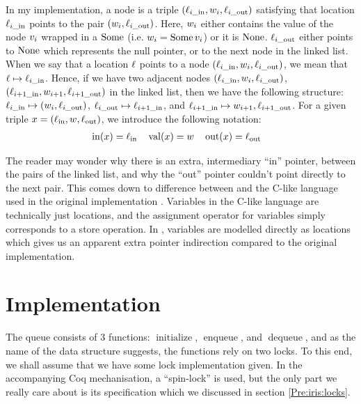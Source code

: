\documentclass[a4paper, 10pt]{report}
\theoremstyle{definition}
\newcommand{\initialise}{\operatorname{initialize}}
\newcommand{\enqueue}{\operatorname{enqueue}}
\newcommand{\dequeue}{\operatorname{dequeue}}
\newcommand{\locin}{\loc_{\mathrm{in}}}
\newcommand{\locinM}[1]{\loc_{#1\_\mathrm{in}}}
\newcommand{\locout}{\loc_{\mathrm{out}}}
\newcommand{\locoutM}[1]{\loc_{#1\_\mathrm{out}}}
\newcommand{\nodeval}{\valB}
\newcommand{\nodevalM}[1]{\nodeval_{#1}}
\newcommand{\nIn}[1]{\operatorname{in}(#1)}
\newcommand{\nVal}[1]{\operatorname{val}(#1)}
\newcommand{\nOut}[1]{\operatorname{out}(#1)}
\newcommand{\node}{x}
\newcommand{\absvalue}{\val}
\begin{document}
In my implementation, a node is a triple $(\locinM{i}, \nodevalM{i}, \locoutM{i})$ satisfying that location $\locinM{i}$ points to the pair $(\nodevalM{i}, \locoutM{i})$. Here, $\nodevalM{i}$ either contains the value of the node $\absvalue_i$ wrapped in a $\operatorname{Some}$ (i.e. $\nodevalM{i} = \Some \absvalue_i$) or it is $\operatorname{None}$. $\locoutM{i}$ either points to $\operatorname{None}$ which represents the null pointer, or to the next node in the linked list. When we say that a location $\ell$ points to a node $(\locinM{i}, \nodevalM{i}, \locoutM{i})$, we mean that $\loc \mapsto \locinM{i}$. Hence, if we have two adjacent nodes $(\locinM{i}, \nodevalM{i}, \locoutM{i})$, $(\locinM{i+1}, \nodevalM{i+1}, \locoutM{i+1})$ in the linked list, then we have the following structure: $\locinM{i} \mapsto (\nodevalM{i}, \locoutM{i})$, $\locoutM{i} \mapsto \locinM{i+1}$, and $\locinM{i+1} \mapsto \nodevalM{i+1}, \locoutM{i+1}$.
For a given triple $\node = (\locin, \nodeval, \locout)$, we introduce the following notation:
\begin{align*}
  &\nIn{\node} = \locin& &\nVal{\node} = \nodeval& &\nOut{\node} = \locout
\end{align*}

The reader may wonder why there is an extra, intermediary ``in'' pointer, between the pairs of the linked list, and why the ``out'' pointer couldn't point directly to the next pair. This comes down to difference between \heaplang and the C-like language used in the original implementation \citep{DBLP:conf/podc/MichaelS96}. Variables in the C-like language are technically just locations, and the assignment operator for variables simply corresponds to a store operation. In \heaplang, variables are modelled directly as locations which gives us an apparent extra pointer indirection compared to the original implementation.


\section{Implementation}
\label{TLMSQ:section:implementation}

The queue consists of 3 functions: $\initialise$, $\enqueue$, and $\dequeue$, and as the name of the data structure suggests, the functions rely on two locks. To this end, we shall assume that we have some lock implementation given. In the accompanying Coq mechanisation, a ``spin-lock'' is used, but the only part we really care about is its specification which we discussed in section \ref{Pre:iris:locks}.
\end{document}
